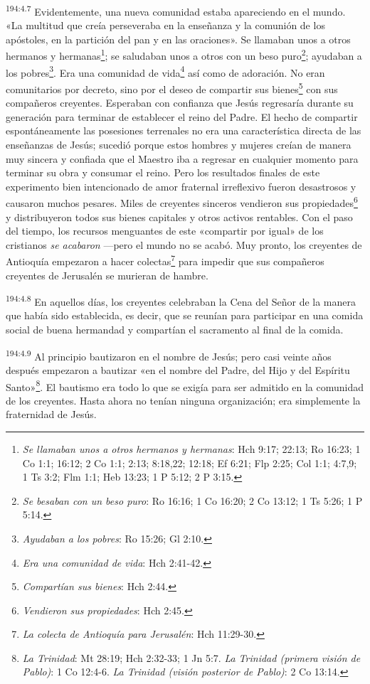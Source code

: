 \par
\textsuperscript{194:4.7} Evidentemente, una nueva comunidad estaba apareciendo en el mundo. «La multitud que creía perseveraba en la enseñanza y la comunión de los apóstoles, en la partición del pan y en las oraciones». Se llamaban unos a otros hermanos y hermanas\footnote{\textit{Se llamaban unos a otros hermanos y hermanas}: Hch 9:17; 22:13; Ro 16:23; 1 Co 1:1; 16:12; 2 Co 1:1; 2:13; 8:18,22; 12:18; Ef 6:21; Flp 2:25; Col 1:1; 4:7,9; 1 Ts 3:2; Flm 1:1; Heb 13:23; 1 P 5:12; 2 P 3:15.}; se saludaban unos a otros con un beso puro\footnote{\textit{Se besaban con un beso puro}: Ro 16:16; 1 Co 16:20; 2 Co 13:12; 1 Ts 5:26; 1 P 5:14.}; ayudaban a los pobres\footnote{\textit{Ayudaban a los pobres}: Ro 15:26; Gl 2:10.}. Era una comunidad de vida\footnote{\textit{Era una comunidad de vida}: Hch 2:41-42.} así como de adoración. No eran comunitarios por decreto, sino por el deseo de compartir sus bienes\footnote{\textit{Compartían sus bienes}: Hch 2:44.} con sus compañeros creyentes. Esperaban con confianza que Jesús regresaría durante su generación para terminar de establecer el reino del Padre. El hecho de compartir espontáneamente las posesiones terrenales no era una característica directa de las enseñanzas de Jesús; sucedió porque estos hombres y mujeres creían de manera muy sincera y confiada que el Maestro iba a regresar en cualquier momento para terminar su obra y consumar el reino. Pero los resultados finales de este experimento bien intencionado de amor fraternal irreflexivo fueron desastrosos y causaron muchos pesares. Miles de creyentes sinceros vendieron sus propiedades\footnote{\textit{Vendieron sus propiedades}: Hch 2:45.} y distribuyeron todos sus bienes capitales y otros activos rentables. Con el paso del tiempo, los recursos menguantes de este «compartir por igual» de los cristianos \textit{se acabaron} ---pero el mundo no se acabó. Muy pronto, los creyentes de Antioquía empezaron a hacer colectas\footnote{\textit{La colecta de Antioquía para Jerusalén}: Hch 11:29-30.} para impedir que sus compañeros creyentes de Jerusalén se murieran de hambre.

\par
\textsuperscript{194:4.8} En aquellos días, los creyentes celebraban la Cena del Señor de la manera que había sido establecida, es decir, que se reunían para participar en una comida social de buena hermandad y compartían el sacramento al final de la comida.

\par
\textsuperscript{194:4.9} Al principio bautizaron en el nombre de Jesús; pero casi veinte años después empezaron a bautizar «en el nombre del Padre, del Hijo y del Espíritu Santo»\footnote{\textit{La Trinidad}: Mt 28:19; Hch 2:32-33; 1 Jn 5:7. \textit{La Trinidad (primera visión de Pablo)}: 1 Co 12:4-6. \textit{La Trinidad (visión posterior de Pablo)}: 2 Co 13:14.}. El bautismo era todo lo que se exigía para ser admitido en la comunidad de los creyentes. Hasta ahora no tenían ninguna organización; era simplemente la fraternidad de Jesús.

